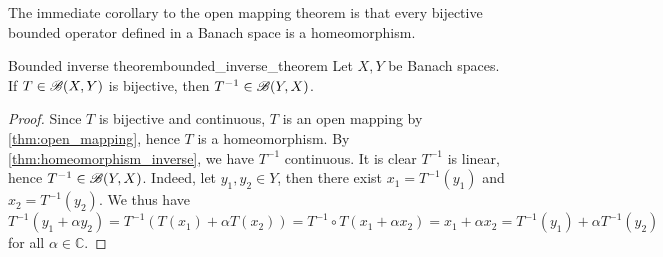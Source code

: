 The immediate corollary to the open mapping theorem is that every bijective bounded operator defined in a Banach space is a homeomorphism.
\begin{theorem}{Bounded inverse theorem}{bounded_inverse_theorem}
    Let \(X, Y\) be Banach spaces. If \(T \in \mathscr{B}(X, Y)\) is bijective, then \(T^{-1} \in \mathscr{B}(Y, X)\).
\end{theorem}
\begin{proof}
    Since \(T\) is bijective and continuous, \(T\) is an open mapping by \cref{thm:open_mapping}, hence \(T\) is a homeomorphism. By \cref{thm:homeomorphism_inverse}, we have \(T^{-1}\) continuous. It is clear \(T^{-1}\) is linear, hence \(T^{-1} \in \mathscr{B}(Y, X)\). Indeed, let \(y_1,y_2 \in Y\), then there exist \(x_1 = T^{-1}(y_1)\) and \(x_2 = T^{-1}(y_2)\). We thus have
    \begin{equation*}
        T^{-1}(y_1 + \alpha y_2) = T^{-1}(T(x_1) + \alpha T(x_2)) = T^{-1}\circ T \left(x_1 + \alpha x_2\right) = x_1 + \alpha x_2 = T^{-1}(y_1) + \alpha T^{-1}(y_2)
    \end{equation*}
    for all \(\alpha \in \mathbb{C}\).
\end{proof}
